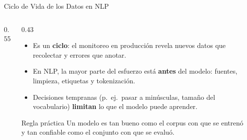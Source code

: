 \documentclass[aspectratio=169, 10pt]{beamer}
\begin{document}
\begin{frame}{Ciclo de Vida de los Datos en NLP}

	\begin{columns}[c]
		\begin{column}{0.55\textwidth}
			\centering
		\end{column}

		\begin{column}{0.43\textwidth}
			\begin{itemize}
				\small
				\item Es un \textbf{ciclo}: el monitoreo en producci\'on revela nuevos datos que recolectar y errores que anotar.
				\item En NLP, la mayor parte del esfuerzo est\'a \textbf{antes} del modelo: fuentes, limpieza, etiquetas y tokenizaci\'on.
				\item Decisiones tempranas (p.\ ej.\ pasar a min\'usculas, tama\~no del vocabulario) \textbf{limitan} lo que el modelo puede aprender.
			\end{itemize}

			\vspace{0.2cm}

			\begin{alertblock}{Regla pr\'actica}
				\small
				Un modelo es tan bueno como el corpus con que se entren\'o y tan confiable como el conjunto con que se evalu\'o.
			\end{alertblock}
		\end{column}
	\end{columns}

\end{frame}
\end{document}
